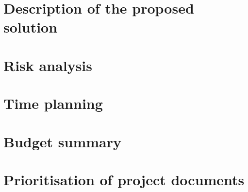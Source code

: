 \section{Description of the proposed solution}
\section{Risk analysis}
\section{Time planning}
\section{Budget summary}
\section{Prioritisation of project documents}

